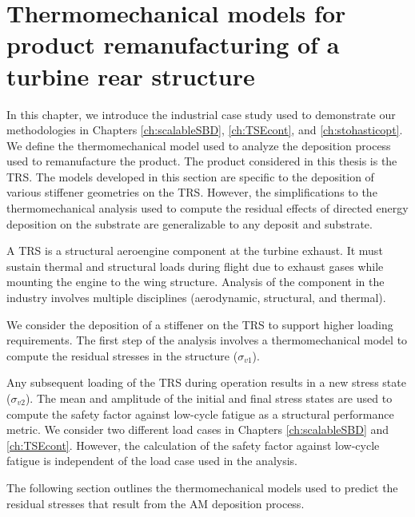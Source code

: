 \chapter{Thermomechanical models for product remanufacturing of a turbine rear structure}
\label{ch:thermomechanical}

In this chapter, we introduce the industrial case study used to demonstrate our methodologies in Chapters \ref{ch:scalableSBD}, \ref{ch:TSEcont}, and \ref{ch:stohasticopt}. We define the thermomechanical model used to analyze the deposition process used to remanufacture the product. The product considered in this thesis is the \ac{TRS}. The models developed in this section are specific to the deposition of various stiffener geometries on the \acf{TRS}. However, the simplifications to the thermomechanical analysis used to compute the residual effects of directed energy deposition on the substrate are generalizable to any deposit and substrate.

A \ac{TRS} is a structural aeroengine component at the turbine exhaust. It must sustain thermal and structural loads during flight due to exhaust gases while mounting the engine to the wing structure. Analysis of the component in the industry involves multiple disciplines (aerodynamic, structural, and thermal). 

We consider the deposition of a stiffener on the \ac{TRS} to support higher loading requirements. The first step of the analysis involves a thermomechanical model to compute the residual stresses in the structure ($\sigma_{v1}$). 

Any subsequent loading of the \ac{TRS} during operation results in a new stress state ($\sigma_{v2}$). The mean and amplitude of the initial and final stress states are used to compute the safety factor against low-cycle fatigue as a structural performance metric. We consider two different load cases in Chapters \ref{ch:scalableSBD} and \ref{ch:TSEcont}. However, the calculation of the safety factor against low-cycle fatigue is independent of the load case used in the analysis.

The following section outlines the thermomechanical models used to predict the residual stresses that result from the \ac{AM} deposition process.

